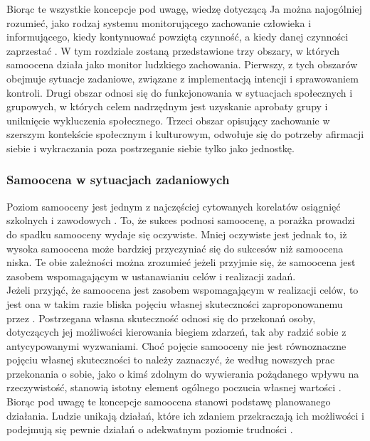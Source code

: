 \documentclass[man]{apa6}
\begin{document}
Biorąc te wszystkie koncepcje pod uwagę, wiedzę dotyczącą Ja można najogólniej rozumieć, jako rodzaj systemu monitorującego zachowanie człowieka  i informującego, kiedy kontynuować powziętą czynność, a kiedy danej czynności zaprzestać \parencite{higgins1996self}. W tym rozdziale zostaną przedstawione trzy obszary, w których samoocena działa jako monitor ludzkiego zachowania. Pierwszy, z tych obszarów obejmuje sytuacje zadaniowe, związane z implementacją intencji i sprawowaniem kontroli. Drugi obszar odnosi się do funkcjonowania w sytuacjach społecznych i grupowych, w których celem nadrzędnym jest uzyskanie aprobaty grupy i uniknięcie wykluczenia społecznego. Trzeci obszar opisujący zachowanie w szerszym kontekście społecznym i kulturowym, odwołuje się do potrzeby afirmacji siebie i wykraczania poza postrzeganie siebie tylko jako jednostkę.\\

\subsubsection{Samoocena w sytuacjach zadaniowych}

Poziom samooceny jest jednym z najczęściej cytowanych korelatów osiągnięć szkolnych \parencite{hansford1982relationship, davies1999reading} i zawodowych \parencite{judge2001relationship}. To, że sukces podnosi samoocenę, a porażka prowadzi do spadku samooceny wydaje się oczywiste. Mniej oczywiste jest jednak to, iż wysoka samoocena może bardziej przyczyniać się do sukcesów niż samoocena niska. Te obie zależności można zrozumieć jeżeli przyjmie się, że samoocena jest zasobem wspomagającym w ustanawianiu celów i realizacji zadań.\\

Jeżeli przyjąć, że samoocena jest zasobem wspomagającym w realizacji celów, to jest ona w takim razie bliska pojęciu własnej skuteczności zaproponowanemu przez \textcite{bandura1977self}. Postrzegana własna skuteczność odnosi się do przekonań osoby, dotyczących jej możliwości kierowania biegiem zdarzeń, tak aby radzić sobie z antycypowanymi wyzwaniami. Choć pojęcie samooceny nie jest równoznaczne pojęciu własnej skuteczności to należy zaznaczyć, że według nowszych prac przekonania o sobie, jako o kimś zdolnym do wywierania pożądanego wpływu na rzeczywistość, stanowią istotny element ogólnego poczucia własnej wartości \parencite{tafarodi2001two}.\\

Biorąc pod uwagę te koncepcje samoocena stanowi podstawę planowanego działania. Ludzie unikają działań, które ich zdaniem przekraczają ich możliwości i podejmują się pewnie działań o adekwatnym poziomie trudności \parencite{bandura1977self}.
\end{document}
